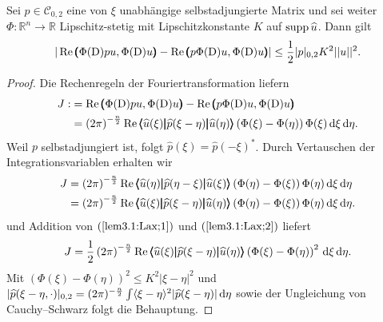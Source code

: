 \begin{lem}\label{lem3.1:Lax}
Sei $p\in \mathcal{C}_{0,2}$ eine von $\xi$ unabhängige selbstadjungierte Matrix und sei weiter $\Phi: \mathbb{R}^n\rightarrow\mathbb{R}$ Lipschitz-stetig mit Lipschitzkonstante $K$ auf $\operatorname{supp} \widehat{u}$. Dann gilt
\begin{equation}
		| \operatorname{Re} \pmb(\Phi(\mathrm D)pu,\Phi(\mathrm D)u\pmb)-\operatorname{Re}\pmb(p\Phi(\mathrm D)u,\Phi(\mathrm D)u\pmb)| \le\frac{1}{2}| p|_{0,2}K^2|| u||^2.
\end{equation}	 
\end{lem}
\begin{proof}
	Die Rechenregeln der Fouriertransformation liefern
	\begin{equation}\label{lem3.1:Lax;1}
		\begin{split} J:&=  \operatorname{Re} \pmb(\Phi(\mathrm D)pu,\Phi(\mathrm D)u\pmb)-\operatorname{Re}\pmb(p\Phi(\mathrm D)u,\Phi(\mathrm D)u\pmb) \\
		&= \left(2\pi\right)^{-\frac{n}{2}}\operatorname{Re}\relax\pmb\langle\widehat{u}(\xi)\pmb|\widehat{p}(\xi-\eta)\pmb|\widehat{u}(\eta)\pmb\rangle\left(\Phi(\xi)-\Phi(\eta)\right)\Phi(\xi)\,\mathrm d \xi\,\mathrm d\eta.
		\end{split}
	\end{equation}
	Weil $p$ selbstadjungiert ist, folgt $\widehat{p}(\xi) = {\widehat{p}}(-\xi)^*$. Durch Vertauschen der Integrationsvariablen erhalten wir
	\begin{equation}\label{lem3.1:Lax;2}
	\begin{split}	
	J&= \left(2\pi\right)^{-\frac{n}{2}}\operatorname{Re}\relax \pmb\langle \widehat{u}(\eta)\pmb|\widehat{p}(\eta-\xi)\pmb|\widehat{u}(\xi)\pmb\rangle\left(\Phi(\eta)-\Phi(\xi)\right)\Phi(\eta)\,\mathrm d \xi\,\mathrm d\eta\\
		&= \left(2\pi\right)^{-\frac{n}{2}}\operatorname{Re}\relax\pmb\langle\widehat{u}(\xi)\pmb|\widehat{p}(\xi-\eta)\pmb|\widehat{u}(\eta)\pmb\rangle\left(\Phi(\eta)-\Phi(\xi)\right)\Phi(\eta)\,\mathrm d \xi\,\mathrm d\eta.
	\end{split}	
	\end{equation}
	und Addition von $(\ref{lem3.1:Lax;1})$ und $(\ref{lem3.1:Lax;2})$ liefert
	\begin{equation}
		J= \frac{1}{2}\left(2\pi\right)^{-\frac{n}{2}}\operatorname{Re}\relax \pmb\langle\widehat{u}(\xi)\pmb|\widehat{p}(\xi-\eta)\pmb|\widehat{u}(\eta)\pmb\rangle\left(\Phi(\xi)-\Phi(\eta)\right)^2\,\mathrm d\xi\,\mathrm d\eta.
	\end{equation}
	Mit  $\left(\Phi(\xi)-\Phi(\eta)\right)^2\le K^2 |\xi-\eta|^2$ und $| \widehat{p}(\xi-\eta,\cdot)|_{0,2} = (2\pi)^{-\frac{n}{2}}\int \langle\xi-\eta\rangle^2 |\widehat{p}(\xi-\eta)|\,\mathrm d\eta$ sowie der Ungleichung von Cauchy--Schwarz folgt die Behauptung. 
\end{proof}

